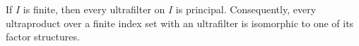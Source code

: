 If $I$ is finite, then every ultrafilter on $I$ is principal. Consequently, every ultraproduct over a finite index set with an ultrafilter is isomorphic to one of its factor structures.
